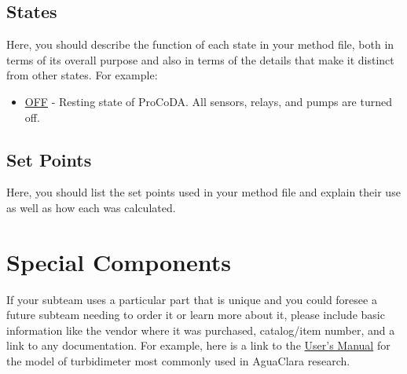 \documentclass[a4paper]{article}
\begin{document}
\subsection*{States}
Here, you should describe the function of each state in your method file, both in terms of its overall purpose and also in terms of the details that make it distinct from other states. For example:
\begin{itemize}
\item \underline{OFF} - Resting state of ProCoDA. All sensors, relays, and pumps are turned off.
\end{itemize}

\subsection*{Set Points}
Here, you should list the set points used in your method file and explain their use as well as how each was calculated.

\section*{Special Components}
If your subteam uses a particular part that is unique and you could foresee a future subteam needing to order it or learn more about it, please include basic information like the vendor where it was purchased, catalog/item number, and a link to any documentation. For example, here is a link to the \href{http://media.wattswater.com/OM-24034_MicroTOL_Series.pdf}{User's Manual} for the model of turbidimeter most commonly used in AguaClara research.
\end{document}
